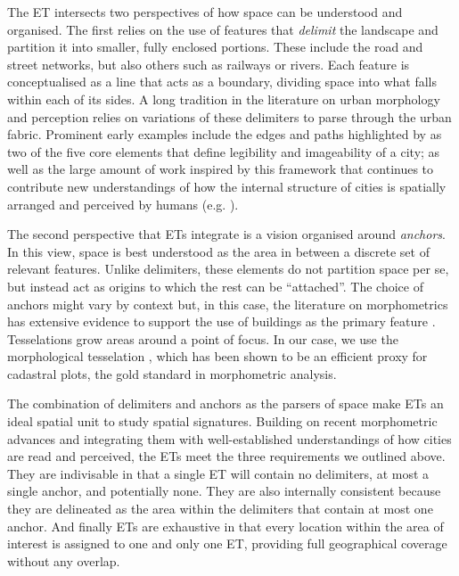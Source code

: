 The ET intersects two perspectives of how space can be understood and organised.
%
The first relies on the use of features that \textit{delimit} the landscape
and partition it into smaller, fully enclosed portions. These include the
road and street networks, but also others such as railways or rivers. Each
feature is conceptualised as a line that acts as a boundary, dividing space
into what falls within each of its sides.
%
A long tradition in the literature on urban morphology and perception
relies on variations of these delimiters to parse through the urban
fabric. Prominent early examples include the edges and paths highlighted by
\cite{lynch1960} as two of the five core elements that define legibility and
imageability of a city; as well as the large amount of work inspired by this
framework that continues to contribute new understandings of how the internal
structure of cities is spatially arranged and perceived by humans (e.g.
\citealp{filomena2019a}).

The second perspective that ETs integrate is a vision organised
around \textit{anchors}. In this view, space is best understood as the area in
between a discrete set of relevant features. Unlike delimiters, these elements
do not partition space per se, but instead act as origins to which the rest
can be ``attached''.
%
The choice of anchors might vary by context but, in this case, the literature
on morphometrics has extensive evidence to support the use of buildings as
the primary feature \citep{hamaina2012a, usui2013estimation, schirmer2015}.
%
Tesselations grow areas around a point of focus. In our case, we use the
morphological tesselation \citep{fleischmann2020morphological}, which has been
shown to be an efficient proxy for cadastral plots, the gold standard in
morphometric analysis.


The combination of delimiters and anchors as the parsers of space make ETs an
ideal spatial unit to study spatial signatures.
%
Building on recent morphometric advances and integrating them with
well-established understandings of how cities are read and perceived, the ETs
meet the three requirements we outlined above.
%
They are indivisable in that a single ET will contain no delimiters, at
most a single anchor, and potentially none.
%
They are also internally consistent because they are delineated as the area
within the delimiters that contain at most one anchor.
%
And finally ETs are exhaustive in that every location within the area of
interest is assigned to one and only one ET, providing full geographical
coverage without any overlap.

